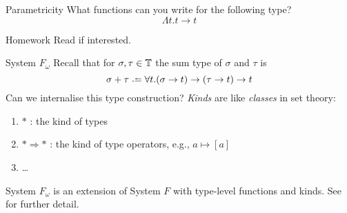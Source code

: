 \begin{frame}{Parametricity}
  What functions can you write for the following type?
  \[
    \Lambda t. t \to t 
  \]

  \begin{block}{Homework}
    Read \cite{Wadler1989} if interested. 
  \end{block}
\end{frame}

\begin{frame}{System $F_\omega$}
  Recall that for $\sigma, \tau \in \mathbb{T}$ the sum type of $\sigma$ and $\tau$
  is 
  \[
    \sigma + \tau \defeq \forall t. (\sigma \to t) \to (\tau \to t) \to t
  \]
  Can we internalise this \alert{type construction}? 
  \vfill
  \alert{\emph{Kinds}} are like \emph{classes} in set theory:
  \begin{enumerate}
    \item $*$ : the kind of types 
    \item $* \Rightarrow *$ : the kind of type operators, e.g., 
      $a \mapsto [a]$ 
    \item \ldots 
  \end{enumerate}
  System $F_\omega$ is an extension of System $F$ with type-level functions and
  kinds. See \cite{Pierce2002} for further detail. 
\end{frame}

